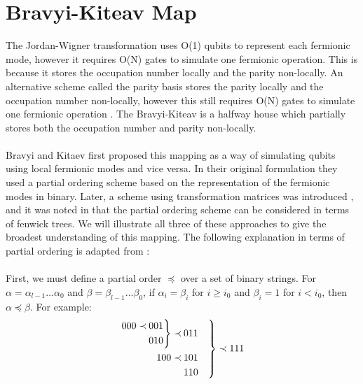 \documentclass[twoside]{article}
\begin{document}
\section{Bravyi-Kiteav Map}\label{bravyi-kitaev_section}
The Jordan-Wigner transformation uses O(1) qubits to represent each fermionic mode, however it requires O(N) gates to simulate one fermionic operation. This is because it stores the occupation number locally and the parity non-locally. An alternative scheme called the parity basis stores the parity locally and the occupation number non-locally, however this still requires O(N) gates to simulate one fermionic operation \cite{seeley}. The Bravyi-Kiteav is a halfway house which partially stores both the occupation number and parity non-locally.\\\\
Bravyi and Kitaev first proposed this mapping as a way of simulating qubits using local fermionic modes and vice versa. In their original formulation they used a partial ordering scheme based on the representation of the fermionic modes in binary. Later, a scheme using transformation matrices was introduced \cite{seeley}, and it was noted in \cite{operatorLocality} that the partial ordering scheme can be considered in terms of fenwick trees. We will illustrate all three of these approaches to give the broadest understanding of this mapping. The following explanation in terms of partial ordering is adapted from \cite{bravyikitaev}: \\\\First, we must define a partial order $\preceq$ over a set of binary strings. For $\alpha = \alpha_{l-1}\ldots \alpha_0$ and $\beta = \beta_{l-1}\ldots \beta_0$, if $\alpha_i = \beta_i$ for $i\geq i_0$ and $\beta_i = 1$ for $i < i_0$, then $\alpha \preceq \beta$. For example:
$$
\begin{rcases}
        \begin{aligned}
        \begin{rcases}
                \begin{aligned}
                        000 \prec \>&001 \\
                                  &010
               \end{aligned}
       \end{rcases} \prec \>&011 \\
        100 \prec \>&101\\
                  &110
        \end{aligned}
\end{rcases}
\prec 111
$$
\end{document}
